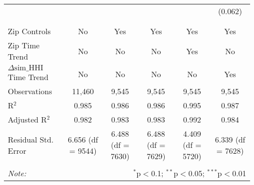 \begin{table}[H]
{\begin{tabular}{@{\extracolsep{5pt}}lccccc}
   &  &  &  &  & (0.062) \\  

   & & & & & \\  

 \hline \\[-1.8ex]  

 Zip Controls & No & Yes & Yes & Yes & Yes \\  

 Zip Time Trend & No & No & No & Yes & No \\  

 $\Delta \text{sim\_HHI}$ Time Trend & No & No & No & No & Yes \\  

 Observations & 11,460 & 9,545 & 9,545 & 9,545 & 9,545 \\  

 R$^{2}$ & 0.985 & 0.986 & 0.986 & 0.995 & 0.987 \\  

 Adjusted R$^{2}$ & 0.982 & 0.983 & 0.983 & 0.992 & 0.984 \\  

 Residual Std. Error & 6.656 (df = 9544) & 6.488 (df = 7630) & 6.488 (df = 7629) & 4.409 (df = 5720) & 6.339 (df = 7628) \\  

 \hline  

 \hline \\[-1.8ex]  

 \textit{Note:}  & \multicolumn{5}{r}{$^{*}$p$<$0.1; $^{**}$p$<$0.05; $^{***}$p$<$0.01} \\  

 \end{tabular}}  

 \end{table}  

 



